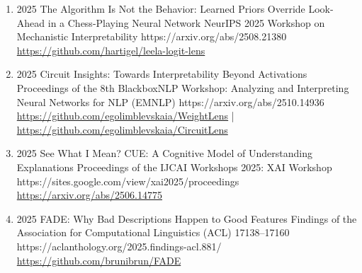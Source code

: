 {\begin{enumerate}
        \item {}
                        {2025}
                        {The Algorithm Is Not the Behavior: Learned Priors Override Look-Ahead in a Chess-Playing Neural Network}
                        {NeurIPS 2025 Workshop on Mechanistic Interpretability}
                        {}
                        {https://arxiv.org/abs/2508.21380}
                        {
                            \\\href{https://github.com/hartigel/leela-logit-lens}{https://github.com/hartigel/leela-logit-lens}
                        }

        \item {}
                        {2025}
                        {Circuit Insights: Towards Interpretability Beyond Activations}
                        {Proceedings of the 8th BlackboxNLP Workshop: Analyzing and Interpreting Neural Networks for NLP (EMNLP)}
                        {}
                        {https://arxiv.org/abs/2510.14936}
                        {
                            \\\href{https://github.com/egolimblevskaia/WeightLens}{https://github.com/egolimblevskaia/WeightLens}
                            |
                            \href{https://github.com/egolimblevskaia/CircuitLens}{https://github.com/egolimblevskaia/CircuitLens}
                        }

        \item {}
                        {2025}
                        {See What I Mean? CUE: A Cognitive Model of Understanding Explanations}
                        {Proceedings of the IJCAI Workshops 2025: XAI Workshop}
                        {}
                        {https://sites.google.com/view/xai2025/proceedings}
                        {\\
                        \href{https://arxiv.org/abs/2506.14775}{https://arxiv.org/abs/2506.14775}
                        }
                        
        \item {}
                        {2025}
                        {FADE: Why Bad Descriptions Happen to Good Features}
                        {Findings of the Association for Computational Linguistics (ACL)}
                        {17138--17160}
                        {https://aclanthology.org/2025.findings-acl.881/}
                        {
                            \\\href{https://github.com/brunibrun/FADE}{https://github.com/brunibrun/FADE}
                        }
                 

\end{enumerate}}
